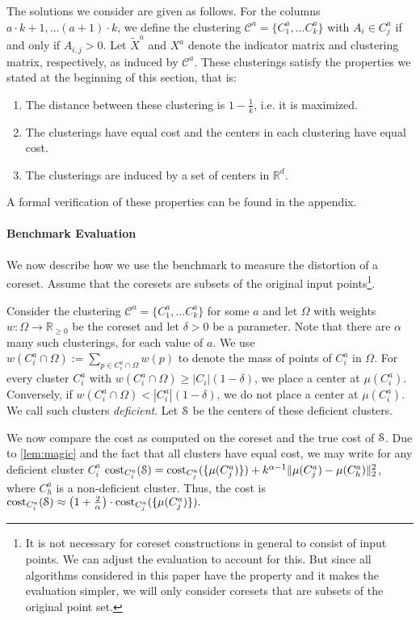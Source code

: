 The solutions we consider are given as follows. For the columns $a\cdot k+1,\ldots (a+1)\cdot k$, we define the clustering $\mathcal{C}^{a} = \{C_1^a,\ldots C_k^a\}$ with 
$A_i\in C_j^a$ if and only if $A_{i,j} > 0$. Let $\tilde X^a$ and $X^{a}$ denote the indicator matrix and clustering matrix, respectively, as induced by $\mathcal{C}^{a}$.
These clusterings satisfy the properties we stated at the beginning of this section, that is:
\begin{enumerate}
\item The distance between these clustering is $1-\frac{1}{k}$, i.e. it is maximized.
\item The clusterings have equal cost and the centers in each clustering have equal cost.
\item The clusterings are induced by a set of centers in $\mathbb{R}^d$.
\end{enumerate}
A formal verification of these properties can be found in the appendix.




\paragraph*{Benchmark Evaluation}

We now describe how we use the benchmark to measure the distortion of a coreset. Assume that the coresets are subsets of the original input points\footnote{It is not necessary for coreset constructions in general to consist of input points. We can adjust the evaluation to account for this. But since all algorithms considered in this paper have the property and it makes the evaluation simpler, we will only consider coresets that are subsets of the original point set.}.

Consider the clustering $\mathcal{C}^{a} = \{C_1^a,\ldots C_k^a\}$ for some $a$ and let $\Omega$ with weights $w:\Omega\rightarrow \mathbb{R}_{\geq 0}$ be the coreset and let $\delta>0$ be a parameter. 
Note that there are $\alpha$ many such clusterings, for each value of $a$.
We use $w(C_i^a \cap \Omega):=\sum_{p\in C_i^a \cap \Omega} w(p)$ to denote the mass of points of $C_i^a$ in $\Omega$.
For every cluster $C_i^a$ with $w(C_i^a \cap \Omega)\geq |C_i| (1-\delta)$, we place a center at $\mu(C_i^a)$. Conversely, if $w(C_i^a \cap \Omega)< |C_i^a| (1-\delta)$, we do not place a center at $\mu(C_i^a)$. We call such clusters \emph{deficient}. Let $\mathcal{S}$ be the centers of these deficient clusters.

We now compare the cost as computed on the coreset and the true cost of $\mathcal{S}$. Due to \cref{lem:magic} and the fact that all clusters have equal cost, we may write for any deficient cluster $C_i^a$
$\text{cost}_{C_i^a}(\mathcal{S}) = \text{cost}_{C_j^a}(\{\mu(C_j^a)\}) + k^{\alpha-1}\|\mu(C_j^a)-\mu(C_h^a)\|_2^2$, where $C_h^a$ is a non-deficient cluster.
Thus, the cost is $\text{cost}_{C_i^a}(\mathcal{S}) \approx \left(1+\frac{2}{\alpha}\right)\cdot \text{cost}_{C_j^a}(\{\mu(C_j^a)\}).$

